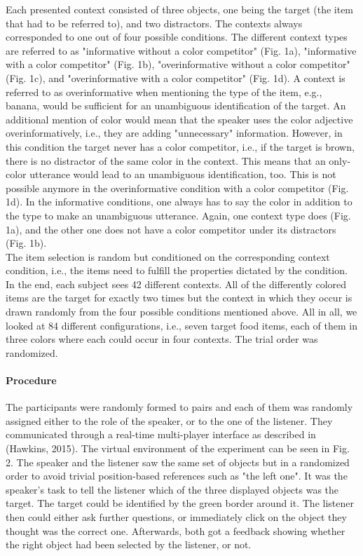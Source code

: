 \documentclass[10pt,letterpaper]{article}
\begin{document}
Each presented context consisted of three objects, one being the target (the item that had to be referred to), and two distractors. The contexts always corresponded to one out of four possible conditions. The different context types are referred to as "informative without a color competitor" (Fig. 1a), "informative with a color competitor" (Fig. 1b), "overinformative without a color competitor" (Fig. 1c), and "overinformative with a color competitor" (Fig. 1d). A context is referred to as overinformative when mentioning the type of the item, e.g., banana, would be sufficient for an unambiguous identification of the target. An additional mention of color would mean that the speaker uses the color adjective overinformatively, i.e., they are adding "unnecessary" information. However, in this condition the target never has a color competitor, i.e., if the target is brown, there is no distractor of the same color in the context. This means that an only-color utterance would lead to an unambiguous identification, too. This is not possible anymore in the overinformative condition with a color competitor (Fig. 1d). In the informative conditions, one always has to say the color in addition to the type to make an unambiguous utterance. Again, one context type does (Fig. 1a), and the other one does not have a color competitor under its distractors (Fig. 1b).
\\The item selection is random but conditioned on the corresponding context condition, i.e., the items need to fulfill the properties dictated by the condition. In the end, each subject sees 42 different contexts. All of the differently colored items are the target for exactly two times but the context in which they occur is drawn randomly from the four possible conditions mentioned above. All in all, we looked at 84 different configurations, i.e., seven target food items, each of them in three colors where each could occur in four contexts. The trial order was randomized.


\paragraph{Procedure}
The participants were randomly formed to pairs and each of them was randomly assigned either to the role of the speaker, or to the one of the listener. They communicated through a real-time multi-player interface as described in (Hawkins, 2015). The virtual environment of the experiment can be seen in Fig. 2. The speaker and the listener saw the same set of objects but in a randomized order to avoid trivial position-based references such as "the left one". It was the speaker's task to tell the listener which of the three displayed objects was the target. The target could be identified by the green border around it. The listener then could either ask further questions, or immediately click on the object they thought was the correct one. Afterwards, both got a feedback showing whether the right object had been selected by the listener, or not.
\end{document}
